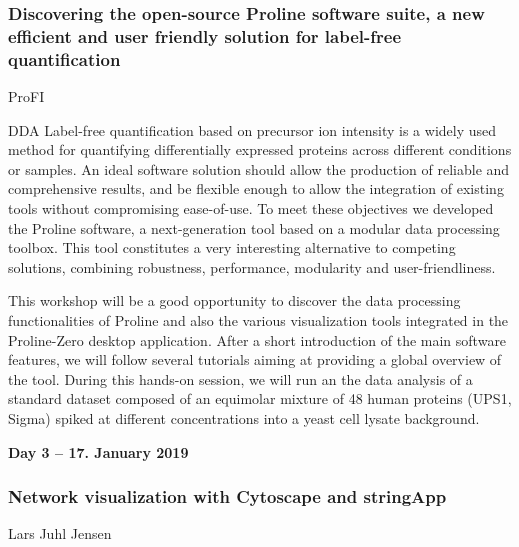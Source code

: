 \subsubsection*{\color{eubicRed} Discovering the open-source Proline software suite, a new efficient and user friendly solution for label-free quantification}
{\color{eubicGray}ProFI}

DDA Label-free quantification based on precursor ion intensity is a widely used
method for quantifying differentially expressed proteins across different
conditions or samples. An ideal software solution should allow the production
of reliable and comprehensive results, and be flexible enough to allow the
integration of existing tools without compromising ease-of-use. To meet these
objectives we developed the Proline software, a next-generation tool based on a
modular data processing toolbox. This tool constitutes a very interesting
alternative to competing solutions, combining robustness, performance,
modularity and user-friendliness.

This workshop will be a good opportunity to discover the data processing
functionalities of Proline and also the various visualization tools integrated
in the Proline-Zero desktop application. After a short introduction of the main
software features, we will follow several tutorials aiming at providing a
global overview of the tool. During this hands-on session, we will run an the
data analysis of a standard dataset composed of an equimolar mixture of 48
human proteins (UPS1, Sigma) spiked at different concentrations into a yeast
cell lysate background.

\vspace{1cm}
\noindent\textbf{Day 3 -- 17. January 2019}

\subsubsection*{\color{eubicRed} Network visualization with Cytoscape and stringApp}
{\color{eubicGray}Lars Juhl Jensen}

